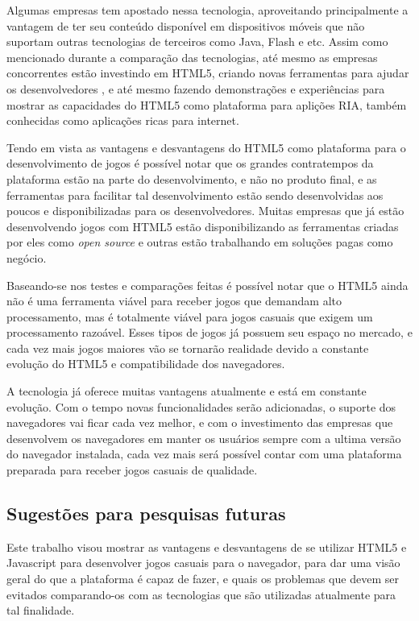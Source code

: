 Algumas empresas tem apostado nessa tecnologia, aproveitando
principalmente a vantagem de ter seu conteúdo disponível em
dispositivos móveis que não suportam outras tecnologias de terceiros
como Java, Flash e etc. Assim como mencionado durante a comparação das
tecnologias, até mesmo as empresas concorrentes estão investindo em
HTML5, criando novas ferramentas para ajudar
os desenvolvedores \cite{website:adobeedge}, e até mesmo fazendo
demonstrações e experiências para mostrar as capacidades do HTML5 como
plataforma para aplições RIA, também conhecidas como aplicações ricas
para internet.

Tendo em vista as vantagens e desvantagens do HTML5 como plataforma
para o desenvolvimento de jogos é possível notar que os grandes
contratempos da plataforma estão na parte do desenvolvimento, e não no
produto final, e as ferramentas para facilitar tal desenvolvimento
estão sendo desenvolvidas aos poucos e disponibilizadas para os
desenvolvedores. Muitas empresas que já estão desenvolvendo jogos com HTML5
estão disponibilizando as ferramentas criadas por eles como
\textit{open source} e outras estão trabalhando em soluções pagas como negócio.

Baseando-se nos testes e comparações feitas é possível notar que o
HTML5 ainda não é uma ferramenta viável para receber jogos que
demandam alto processamento, mas é totalmente viável para jogos
casuais que exigem um processamento razoável. Esses tipos de jogos já possuem seu espaço no
mercado, e cada vez mais jogos maiores vão se tornarão realidade devido a constante evolução
do HTML5 e compatibilidade dos navegadores.

A tecnologia já oferece muitas vantagens atualmente e está em
constante evolução. Com o tempo novas funcionalidades serão
adicionadas, o suporte dos navegadores vai ficar cada vez melhor, e
com o investimento das empresas que desenvolvem os navegadores em manter
os usuários sempre com a ultima versão do navegador instalada, cada vez
mais será possível contar com uma plataforma preparada para receber
jogos casuais de qualidade.

\subsection{Sugestões para pesquisas futuras}

Este trabalho visou mostrar as vantagens e desvantagens de se utilizar
HTML5 e Javascript para desenvolver jogos casuais para o navegador,
para dar uma visão geral do que a plataforma é capaz de fazer, e quais
os problemas que devem ser evitados comparando-os com as tecnologias
que são utilizadas atualmente para tal finalidade.

